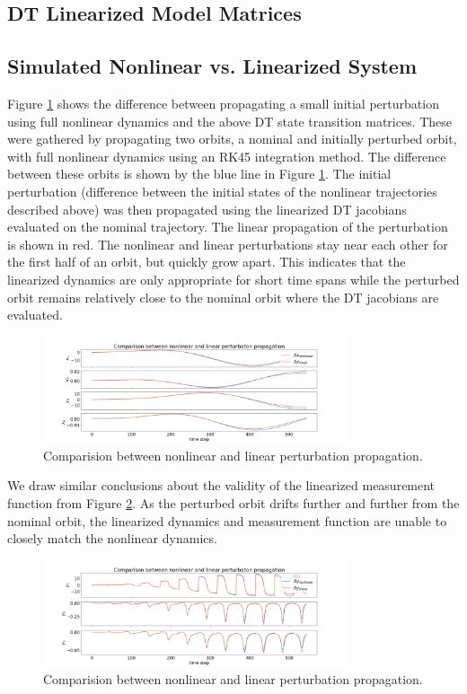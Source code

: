 \documentclass[11pt, a4paper]{article}
\begin{document}
\subsection{DT Linearized Model Matrices}

\subsection{Simulated Nonlinear vs. Linearized System}
Figure \ref{fig:nlvl_s} shows the difference between propagating a small initial perturbation using full nonlinear dynamics and the above DT state transition matrices. 
These were gathered by propagating two orbits, a nominal and initially perturbed orbit, with full nonlinear dynamics using an RK45 integration method.
The difference between these orbits is shown by the blue line in Figure \ref{fig:nlvl_s}. 
The initial perturbation (difference between the initial states of the nonlinear trajectories described above) was then propagated using the linearized DT jacobians evaluated on the nominal trajectory. 
The linear propagation of the perturbation is shown in red. 
The nonlinear and linear perturbations stay near each other for the first half of an orbit, but quickly grow apart.
This indicates that the linearized dynamics are only appropriate for short time spans while the perturbed orbit remains relatively close to the nominal orbit where the DT jacobians are evaluated. 

\begin{figure}[H]
	\centering
	\includegraphics[width=0.8\textwidth]{./Figures/nonlvl_state.png}
	\caption{Comparision between nonlinear and linear perturbation propagation.}
	\label{fig:nlvl_s}
\end{figure}

We draw similar conclusions about the validity of the linearized measurement function from Figure \ref{fig:nlvl_m}.
As the perturbed orbit drifts further and further from the nominal orbit, the linearized dynamics and measurement function are unable to closely match the nonlinear dynamics. 

\begin{figure}[H]
	\centering
	\includegraphics[width=0.8\textwidth]{./Figures/nonlvl_meas.png}
	\caption{Comparision between nonlinear and linear perturbation propagation.}
	\label{fig:nlvl_m}
\end{figure}
\end{document}
